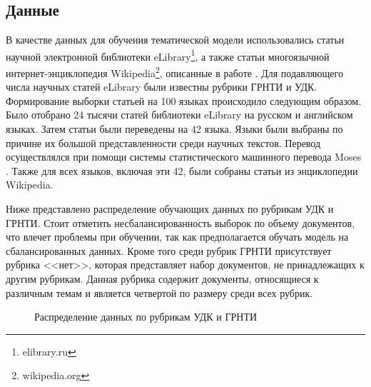 \documentclass[12pt, twoside]{article}
\begin{document}
\subsection{Данные}

В качестве данных для обучения тематической модели использовались статьи научной электронной библиотеки eLibrary\footnote{elibrary.ru}, а также статьи многоязычной интернет-энциклопедия Wikipedia\footnote{wikipedia.org}, описанные в работе \cite{}. %
Для подавляющего числа научных статей eLibrary были известны рубрики ГРНТИ и УДК. Формирование выборки статьей на 100 языках происходило следующим образом. Было отобрано 24 тысячи статей библиотеки eLibrary на русском и английском языках. Затем статьи были переведены на 42 языка. Языки были выбраны по причине их большой представленности среди научных текстов. Перевод осуществлялся при помощи системы статистического машинного перевода Moses \cite{Moses}. Также для всех языков, включая эти 42, были собраны статьи из энциклопедии Wikipedia.

Ниже представлено распределение обучающих данных по рубрикам УДК и ГРНТИ. Стоит отметить несбалансированность выборок по объему документов, что влечет проблемы при обучении, так как предполагается обучать модель на сбалансированных данных. Кроме того среди рубрик ГРНТИ присутствует рубрика <<нет>>, которая представляет набор документов, не принадлежащих к другим рубрикам. Данная рубрика содержит документы, относящиеся к различным темам и является четвертой по размеру среди всех рубрик.

\begin{figure}[h]
 \caption{Распределение данных по рубрикам УДК и ГРНТИ}
  \label{fig:1}
\end{figure}
\end{document}
